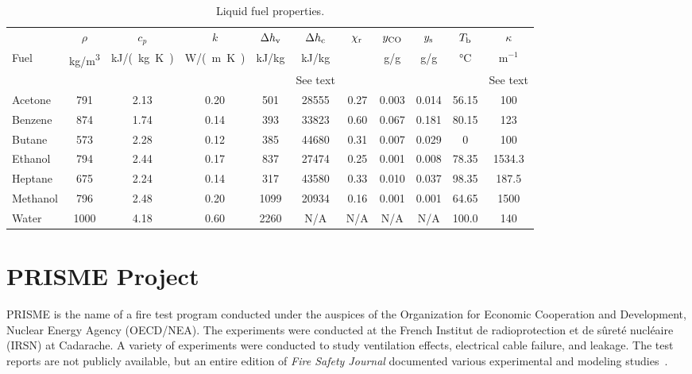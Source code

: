 \begin{table}[h!]
\centering
\caption[Liquid fuel properties]{Liquid fuel properties.} \label{fuelprops}
\begin{tabular}{|l|c|c|c|c|c|c|c|c|c|c|} \hline
        & $\rho$               & $c_p$                        & $k$                &  $\Delta h_{\rm v}$         &  $\Delta h_{\rm c}$  & $\chi_{\rm r}$       & $y_{\rm CO}$         & $y_{\rm s}$          & $T_{\rm b}$                    & $\kappa$  \\
Fuel    & \unit{\kg/\m^3}        & \unit{\kJ/(\kg.\K)}            & \unit{\W/(\m.\K)}    & \unit{\kJ/\kg}                & \unit{\kJ/\kg}         &                      &  \unit{\g/\g}          &  \unit{\g/\g}          & \unit{\degreeCelsius}                      & m$^{-1}$  \\
        & \cite{Babrauskas:1}  & \cite{Webbook:HeatCapacity}  & \cite{CRCHandbook} &  \cite{Webbook:FluidThermo} & See text             & \cite{SFPE:Tewarson} & \cite{SFPE:Tewarson} & \cite{SFPE:Tewarson} & \cite{Webbook:BoilingPoint}    & See text  \\
\hline \hline
Acetone  &  791  &  2.13   & 0.20  &   501   & 28555  & 0.27 & 0.003 & 0.014 & 56.15 & 100    \\ \hline
Benzene  &  874  &  1.74   & 0.14  &   393   & 33823  & 0.60 & 0.067 & 0.181 & 80.15 & 123    \\ \hline
Butane   &  573  &  2.28   & 0.12  &   385   & 44680  & 0.31 & 0.007 & 0.029 & 0     & 100    \\ \hline
Ethanol  &  794  &  2.44   & 0.17  &   837   & 27474  & 0.25 & 0.001 & 0.008 & 78.35 & 1534.3 \\ \hline
Heptane  &  675  &  2.24   & 0.14  &   317   & 43580  & 0.33 & 0.010 & 0.037 & 98.35 & 187.5  \\ \hline
Methanol &  796  &  2.48   & 0.20  &   1099  & 20934  & 0.16 & 0.001 & 0.001 & 64.65 & 1500   \\ \hline
Water    & 1000  &  4.18   & 0.60  &   2260  & N/A    & N/A  & N/A   & N/A   & 100.0 & 140    \\ \hline
\end{tabular}
\end{table}


\section{PRISME Project}
\label{PRISME_Description}

PRISME is the name of a fire test program conducted under the auspices of the Organization for Economic Cooperation and Development, Nuclear Energy Agency (OECD/NEA). The experiments were conducted at the French Institut de radioprotection et de s\^{u}ret\'{e} nucl\'{e}aire (IRSN) at Cadarache. A variety of experiments were conducted to study ventilation effects, electrical cable failure, and leakage. The test reports are not publicly available, but an entire edition of {\em Fire Safety Journal} documented various experimental and modeling studies~\cite{Audouin:FSJ}.

